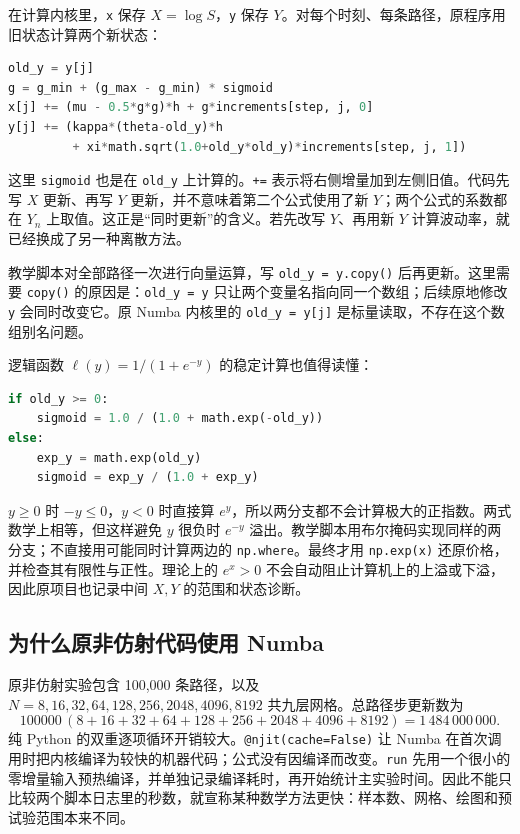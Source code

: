 \documentclass[11pt,a4paper,fontset=none]{ctexart}
\numberwithin{equation}{section}
\begin{document}
在计算内核里，\texttt{x} 保存 $X=\log S$，\texttt{y} 保存 $Y$。对每个时刻、每条路径，原程序用旧状态计算两个新状态：
\begin{lstlisting}[language=Python]
old_y = y[j]
g = g_min + (g_max - g_min) * sigmoid
x[j] += (mu - 0.5*g*g)*h + g*increments[step, j, 0]
y[j] += (kappa*(theta-old_y)*h
         + xi*math.sqrt(1.0+old_y*old_y)*increments[step, j, 1])
\end{lstlisting}
这里 \texttt{sigmoid} 也是在 \texttt{old\_y} 上计算的。\texttt{+=} 表示将右侧增量加到左侧旧值。代码先写 $X$ 更新、再写 $Y$ 更新，并不意味着第二个公式使用了新 $Y$；两个公式的系数都在 $Y_n$ 上取值。这正是“同时更新”的含义。若先改写 $Y$、再用新 $Y$ 计算波动率，就已经换成了另一种离散方法。

教学脚本对全部路径一次进行向量运算，写 \texttt{old\_y = y.copy()} 后再更新。这里需要 \texttt{copy()} 的原因是：\texttt{old\_y = y} 只让两个变量名指向同一个数组；后续原地修改 \texttt{y} 会同时改变它。原 Numba 内核里的 \texttt{old\_y = y[j]} 是标量读取，不存在这个数组别名问题。

逻辑函数 $\ell(y)=1/(1+e^{-y})$ 的稳定计算也值得读懂：
\begin{lstlisting}[language=Python]
if old_y >= 0:
    sigmoid = 1.0 / (1.0 + math.exp(-old_y))
else:
    exp_y = math.exp(old_y)
    sigmoid = exp_y / (1.0 + exp_y)
\end{lstlisting}
$y\geq0$ 时 $-y\leq0$，$y<0$ 时直接算 $e^y$，所以两分支都不会计算极大的正指数。两式数学上相等，但这样避免 $y$ 很负时 $e^{-y}$ 溢出。教学脚本用布尔掩码实现同样的两分支；不直接用可能同时计算两边的 \texttt{np.where}。最终才用 \texttt{np.exp(x)} 还原价格，并检查其有限性与正性。理论上的 $e^x>0$ 不会自动阻止计算机上的上溢或下溢，因此原项目也记录中间 $X,Y$ 的范围和状态诊断。

\subsection{为什么原非仿射代码使用 Numba}

原非仿射实验包含 100,000 条路径，以及 $N=8,16,32,64,128,256,2048,4096,8192$ 共九层网格。总路径步更新数为
\[
100000\,(8+16+32+64+128+256+2048+4096+8192)
=1\,484\,000\,000.
\]
纯 Python 的双重逐项循环开销较大。\texttt{@njit(cache=False)} 让 Numba 在首次调用时把内核编译为较快的机器代码；公式没有因编译而改变。\texttt{run} 先用一个很小的零增量输入预热编译，并单独记录编译耗时，再开始统计主实验时间。因此不能只比较两个脚本日志里的秒数，就宣称某种数学方法更快：样本数、网格、绘图和预试验范围本来不同。
\end{document}
